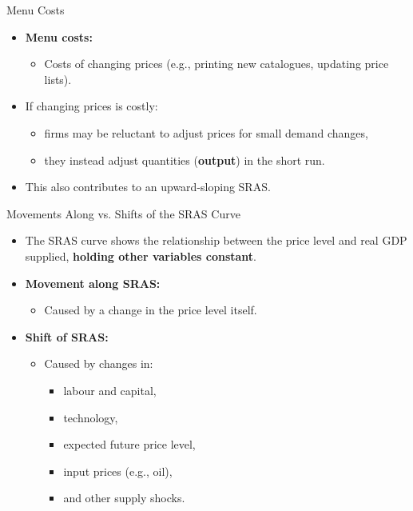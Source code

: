 \documentclass[aspectratio=169]{beamer}
\begin{document}
\begin{frame}{Menu Costs}
\transfade
\begin{itemize}
  \item \textbf{Menu costs:}
  \begin{itemize}
    \item Costs of changing prices (e.g., printing new catalogues, updating price lists).
  \end{itemize}
  \item If changing prices is costly:
  \begin{itemize}
    \item firms may be reluctant to adjust prices for small demand changes,
    \item they instead adjust quantities (\textbf{output}) in the short run.
  \end{itemize}
  \item This also contributes to an upward-sloping SRAS.
\end{itemize}
\end{frame}

\begin{frame}{Movements Along vs. Shifts of the SRAS Curve}
\transfade
\begin{itemize}
  \item The SRAS curve shows the relationship between the price level and real GDP supplied, \textbf{holding other variables constant}.
  \item \textbf{Movement along SRAS:}
  \begin{itemize}
    \item Caused by a change in the price level itself.
  \end{itemize}
  \item \textbf{Shift of SRAS:}
  \begin{itemize}
    \item Caused by changes in:
    \begin{itemize}
      \item labour and capital,
      \item technology,
      \item expected future price level,
      \item input prices (e.g., oil),
      \item and other supply shocks.
    \end{itemize}
  \end{itemize}
\end{itemize}
\end{frame}
\end{document}
